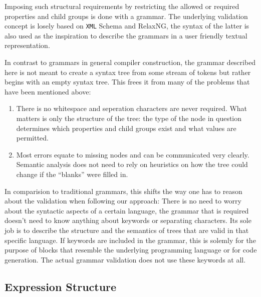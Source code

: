 \documentclass[sigconf,natbib=false]{acmart}
\newcommand\todo[1]{{\bfseries ToDo: #1}}
\begin{document}
Imposing such structural requirements by restricting the allowed or required properties and child groups is done with a grammar. The underlying validation concept is losely based on \texttt{XML} Schema and RelaxNG, the syntax of the latter is also used as the inspiration to describe the grammars in a user friendly textual representation.

In contrast to grammars in general compiler construction, the grammar described here is not meant to create a syntax tree from some stream of tokens but rather begins with an empty syntax tree. This frees it from many of the problems that have been mentioned above:

\begin{enumerate}
\item There is no whitespace and seperation characters are never required. What matters is only the structure of the tree: the type of the node in question determines which properties and child groups exist and what values are permitted.
\item Most errors equate to missing nodes and can be communicated very clearly. Semantic analysis does not need to rely on heuristics on how the tree could change if the \enquote{blanks} were filled in.
\end{enumerate}

In comparision to traditional grammars, this shifts the way one has to reason about the validation when following our approach: There is no need to worry about the syntactic aspects of a certain language, the grammar that is required doesn’t need to know anything about keywords or separating characters. Its sole job is to describe the structure and the semantics of trees that are valid in that specific language. If keywords are included in the grammar, this is solemly for the purpose of blocks that resemble the underlying programming language or for code generation. The actual grammar validation does not use these keywords at all.

\subsection{Expression Structure}
\end{document}
